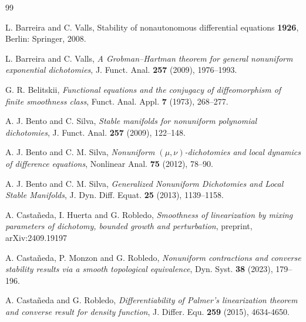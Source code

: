 \documentclass[reqno, a4paper, 10pt]{amsart}
\theoremstyle{plain}
\numberwithin{equation}{section}
\theoremstyle{remark}
\begin{document}
\begin{thebibliography}{99}


 L. Barreira and C. Valls, Stability of nonautonomous differential equations \textbf{1926}, Berlin: Springer, 2008.

L. Barreira and C. Valls, \emph{A Grobman–Hartman theorem for general nonuniform exponential dichotomies}, J. Funct. Anal. \textbf{257} (2009), 1976--1993.




G. R. Belitskii, \emph{Functional equations and the conjugacy of diffeomorphism of finite smoothness class},
Funct. Anal. Appl. {\bf 7} (1973), 268--277.



 A. J.  Bento and C. Silva, \emph{Stable manifolds for nonuniform polynomial dichotomies}, J. Funct. Anal. \textbf{257} (2009), 122--148.



A. J. Bento and C. M. Silva, \emph{Nonuniform $(\mu,\nu)$-dichotomies and local dynamics of difference equations}, Nonlinear Anal. \textbf{75} (2012), 78–90.

A. J. Bento and C. M. Silva, \emph{Generalized Nonuniform Dichotomies and Local Stable Manifolds}, J. Dyn. Diff. Equat. \textbf{25} (2013), 1139–1158.

A. Casta\~{n}eda, I. Huerta and G. Robledo, \emph{Smoothness of linearization by mixing parameters of dichotomy, bounded growth and perturbation}, preprint, 	arXiv:2409.19197 


  A. Casta\~{n}eda, P. Monzon and G. Robledo,
\emph{Nonuniform contractions and converse stability results via a smooth topological equivalence},
Dyn. Syst. \textbf{38} (2023), 179--196.

 A. Casta\~{n}eda and G. Robledo,
\emph{Differentiability of Palmer's linearization theorem and converse result for density function},
J. Differ. Equ. {\bf 259} (2015), 4634-4650.


\end{thebibliography}
\end{document}
